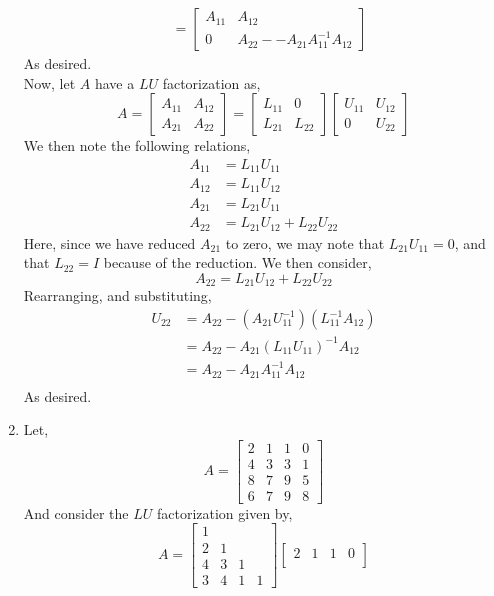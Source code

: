\documentclass[letterpaper,10pt]{article}
\begin{document}
\begin{enumerate}
\begin{align*}
&=\begin{bmatrix}
A_{11} & A_{12}\\0 & A_{22}--A_{21}A_{11}^{-1}A_{12}
\end{bmatrix}
\end{align*}
As desired.\\
Now, let $A$ have a $LU$ factorization as,
\[A=\begin{bmatrix}
A_{11} & A_{12}\\ A_{21} & A_{22}
\end{bmatrix}=\begin{bmatrix}
L_{11} & 0\\ L_{21} & L_{22}
\end{bmatrix}\begin{bmatrix}
U_{11} & U_{12}\\0 & U_{22}
\end{bmatrix} \]
We then note the following relations,
\begin{align*}
A_{11} &=L_{11}U_{11}\\
A_{12} &=L_{11}U_{12}\\
A_{21} &=L_{21}U_{11}\\
A_{22} &=L_{21}U_{12}+L_{22}U_{22}
\end{align*}
Here, since we have reduced $A_{21}$ to zero, we may note that $L_{21}U_{11}=0$, and that $L_{22}=I$ because of the reduction.  We then consider,
\[A_{22}=L_{21}U_{12}+L_{22}U_{22}\]
Rearranging, and substituting,
\begin{align*}
U_{22}&=A_{22}-(A_{21}U_{11}^{-1})(L_{11}^{-1}A_{12})\\
&=A_{22}-A_{21}(L_{11}U_{11})^{-1}A_{12}\\
&=A_{22}-A_{21}A_{11}^{-1}A_{12}\\
\end{align*}
As desired.
\item Let,
\[A=\begin{bmatrix}
2 & 1 & 1 & 0\\ 4 & 3 & 3 & 1\\8 & 7 & 9 & 5\\6 & 7 & 9 & 8
\end{bmatrix}\]
And consider the $LU$ factorization given by,
\[A=\begin{bmatrix}
1 \\
2 & 1 \\
4 & 3 & 1 \\
3 & 4 & 1 & 1
\end{bmatrix}\begin{bmatrix}
2 & 1 & 1 & 0\\

\end{bmatrix}\]
\end{enumerate}
\end{document}
